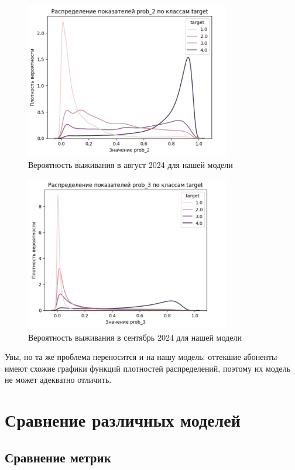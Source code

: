 \documentclass[a4paper,14pt,oneside,openany]{memoir}
\begin{document}
\begin{figure}[H]
	\includegraphics[width=0.8\textwidth]{../figures/prob_2_our.png}
	\caption{Вероятность выживания в август 2024 для нашей модели}
\end{figure}

\begin{figure}[H]
	\includegraphics[width=0.8\textwidth]{../figures/prob_3_our.png}
	\caption{Вероятность выживания в сентябрь 2024 для нашей модели}
\end{figure}

Увы, но та же проблема переносится и на нашу модель: оттекшие абоненты имеют схожие графики функций плотностей распределений, поэтому их модель не может адекватно отличить. 

\section{Сравнение различных моделей}

\subsection{Сравнение метрик}
\end{document}
